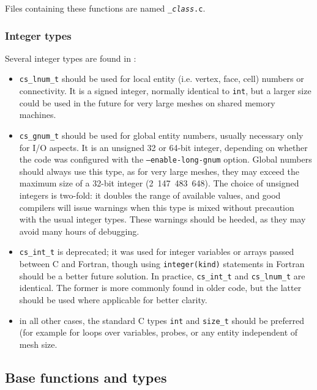 Files containing these functions are named \texttt{\_\textit{class}.c}.

\subsubsection{Integer types}

Several integer types are found in \CS:

\begin{itemize}
\item \texttt{cs\_lnum\_t} should be used for local entity (i.e. vertex, face,
      cell) numbers or connectivity. It is a signed integer, normally identical
      to \texttt{int}, but a larger size could be used in the future for very
      large meshes on shared memory machines.

\item \texttt{cs\_gnum\_t} should be used for global entity numbers, usually
      necessary only for I/O aspects. It is an unsigned 32 or 64-bit integer,
      depending on whether the code was configured with the
      \texttt{--enable-long-gnum} option. Global numbers should always use
      this type, as for very large meshes, they may exceed the maximum size
      of a 32-bit integer (2~147~483~648). The choice of unsigned integers
      is two-fold: it doubles the range of available values, and good compilers
      will issue warnings when this type is mixed without precaution with
      the usual integer types. These warnings should be heeded, as they may
      avoid many hours of debugging.

\item \texttt{cs\_int\_t} is deprecated; it was used for integer variables or arrays
      passed between C and Fortran, though using \texttt{integer(kind)} statements
      in Fortran should be a better future solution. In practice,
      \texttt{cs\_int\_t} and \texttt{cs\_lnum\_t} are identical. The former
      is more commonly found in older code, but the latter should be used where
      applicable for better clarity.

\item in all other cases, the standard C types \texttt{int} and \texttt{size\_t}
      should be preferred (for example for loops over variables, probes, or
      any entity independent of mesh size.
\end{itemize}

\subsection{Base functions and types}

